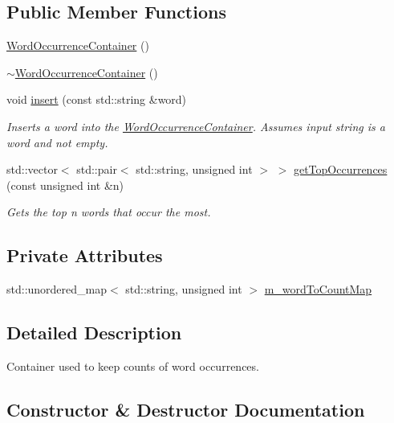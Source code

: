 \subsection*{Public Member Functions}
\begin{DoxyCompactItemize}
\item 
\mbox{\hyperlink{class_word_occurrence_container_a777151c21ae2e8d60fbdecb000cd2f44}{Word\+Occurrence\+Container}} ()
\item 
\mbox{\hyperlink{class_word_occurrence_container_a96a671f07750218a9325a8cab89288ef}{$\sim$\+Word\+Occurrence\+Container}} ()
\item 
void \mbox{\hyperlink{class_word_occurrence_container_a3ea24956cdbd599593bd4c0256cf9d15}{insert}} (const std\+::string \&word)
\begin{DoxyCompactList}\small\item\em Inserts a word into the \mbox{\hyperlink{class_word_occurrence_container}{Word\+Occurrence\+Container}}. Assumes input string is a word and not empty. \end{DoxyCompactList}\item 
std\+::vector$<$ std\+::pair$<$ std\+::string, unsigned int $>$ $>$ \mbox{\hyperlink{class_word_occurrence_container_aa4402285c14c3d282aa34c62934260e1}{get\+Top\+Occurrences}} (const unsigned int \&n)
\begin{DoxyCompactList}\small\item\em Gets the top n words that occur the most. \end{DoxyCompactList}\end{DoxyCompactItemize}
\subsection*{Private Attributes}
\begin{DoxyCompactItemize}
\item 
std\+::unordered\+\_\+map$<$ std\+::string, unsigned int $>$ \mbox{\hyperlink{class_word_occurrence_container_ab2f0abb68fe94056659c7a1e0f919ae2}{m\+\_\+word\+To\+Count\+Map}}
\end{DoxyCompactItemize}


\subsection{Detailed Description}
Container used to keep counts of word occurrences. 

\subsection{Constructor \& Destructor Documentation}
\mbox{\label{class_word_occurrence_container_a777151c21ae2e8d60fbdecb000cd2f44}} 

